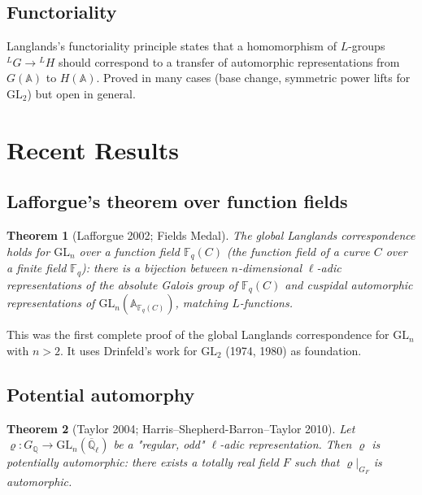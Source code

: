 \documentclass[a4paper,12pt]{amsart}
\newtheorem{theorem}{Theorem}[section]
\theoremstyle{definition}
\theoremstyle{remark}
\newcommand{\Q}{\mathbb{Q}}
\newcommand{\GL}{\mathrm{GL}}
\begin{document}
\subsection{Functoriality}

Langlands's functoriality principle states that a homomorphism of $L$-groups
${}^L G \to {}^L H$ should correspond to a transfer of automorphic representations
from $G(\mathbb{A})$ to $H(\mathbb{A})$. Proved in many cases (base change, symmetric
power lifts for $\GL_2$) but open in general.

\section{Recent Results}
\label{sec:recent}

\subsection{Lafforgue's theorem over function fields}

\begin{theorem}[Lafforgue 2002; Fields Medal]
\label{thm:lafforgue}
The global Langlands correspondence holds for $\GL_n$ over a function field
$\mathbb{F}_q(C)$ (the function field of a curve $C$ over a finite field $\mathbb{F}_q$):
there is a bijection between $n$-dimensional $\ell$-adic representations of the
absolute Galois group of $\mathbb{F}_q(C)$ and cuspidal automorphic representations
of $\GL_n(\mathbb{A}_{\mathbb{F}_q(C)})$, matching $L$-functions.
\end{theorem}

This was the first complete proof of the global Langlands correspondence for $\GL_n$
with $n > 2$. It uses Drinfeld's work for $\GL_2$ (1974, 1980) as foundation.

\subsection{Potential automorphy}

\begin{theorem}[Taylor 2004; Harris--Shepherd-Barron--Taylor 2010]
\label{thm:potential-automorphy}
Let $\varrho\colon G_\Q \to \GL_n(\overline{\Q}_\ell)$ be a "regular, odd"
$\ell$-adic representation. Then $\varrho$ is \emph{potentially automorphic}:
there exists a totally real field $F$ such that $\varrho|_{G_F}$ is automorphic.
\end{theorem}
\end{document}
